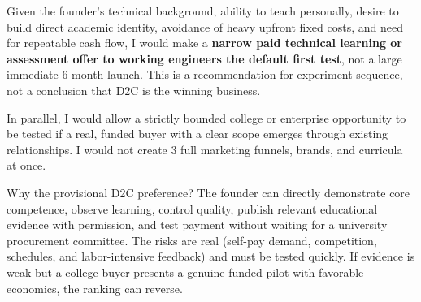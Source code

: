 Given the founder's technical background, ability to teach personally, desire to build direct academic identity, avoidance of heavy upfront fixed costs, and need for repeatable cash flow, I would make a \textbf{narrow paid technical learning or assessment offer to working engineers the default first test}, not a large immediate 6-month launch. This is a recommendation for experiment sequence, not a conclusion that D2C is the winning business.

In parallel, I would allow a strictly bounded college or enterprise opportunity to be tested if a real, funded buyer with a clear scope emerges through existing relationships. I would not create 3 full marketing funnels, brands, and curricula at once.

Why the provisional D2C preference? The founder can directly demonstrate core competence, observe learning, control quality, publish relevant educational evidence with permission, and test payment without waiting for a university procurement committee. The risks are real (self-pay demand, competition, schedules, and labor-intensive feedback) and must be tested quickly. If evidence is weak but a college buyer presents a genuine funded pilot with favorable economics, the ranking can reverse.

